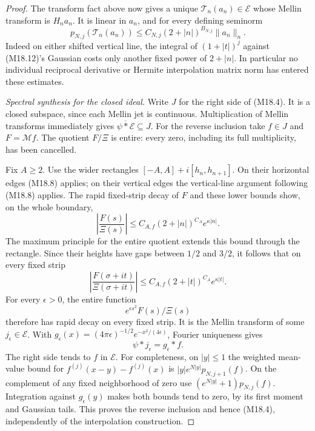 \begin{proof}
The transform fact above now gives a unique
\(\mathcal T_n(a_n)\in\mathcal E\) whose Mellin transform is
\(H_n a_n\).  It is linear in \(a_n\), and for every
defining seminorm
\[
 p_{N,j}(\mathcal T_n(a_n))
       \le C_{N,j}(2+|n|)^{B_{N,j}}\|a_n\|_n .                  \tag{M18.13}
\]
Indeed on either shifted vertical line, the integral
of \((1+|t|)^j\) against (M18.12)'s Gaussian costs
only another fixed power of \(2+|n|\).
In particular no individual reciprocal derivative
or Hermite interpolation matrix norm has entered
these estimates.

\emph{Spectral synthesis for the closed ideal.}
Write \(J\) for the right side of (M18.4).
It is a closed subspace, since each Mellin jet is
continuous.  Multiplication of Mellin transforms
immediately gives
\(\overline{\psi*\mathcal E}\subseteq J\).
For the reverse inclusion take \(f\in J\) and
\(F=\mathcal Mf\).  The quotient \(F/\Xi\) is entire:
every zero, including its full multiplicity, has
been cancelled.

Fix \(A\ge2\).  Use the wider rectangles
\([-A,A]+i[h_n,h_{n+1}]\).  On their horizontal
edges (M18.8) applies; on their vertical edges
the vertical-line argument following (M18.8)
applies.  The rapid fixed-strip decay of \(F\)
and these lower bounds show, on the whole boundary,
\[
 \left|\frac{F(s)}{\Xi(s)}\right|
       \le C_{A,f}(2+|n|)^{C_A}e^{\kappa|n|}.
\]
The maximum principle for the entire quotient
extends this bound through the rectangle.
Since their heights have gaps between \(1/2\)
and \(3/2\), it follows that on every fixed strip
\[
 \left|\frac{F(\sigma+it)}{\Xi(\sigma+it)}\right|
       \le C_{A,f}(2+|t|)^{C_A}e^{\kappa|t|}.                  \tag{M18.14}
\]
For every \(\epsilon>0\), the entire function
\[
                   e^{\epsilon s^2}F(s)/\Xi(s)
\]
therefore has rapid decay on every fixed strip.
It is the Mellin transform of some
\(j_\epsilon\in\mathcal E\).
With \(g_\epsilon(x)=(4\pi\epsilon)^{-1/2}
e^{-x^2/(4\epsilon)}\), Fourier uniqueness gives
\[
                         \psi*j_\epsilon=g_\epsilon*f.
\]
The right side tends to \(f\) in \(\mathcal E\).
For completeness, on \(|y|\le1\) the weighted
mean-value bound for
\(f^{(j)}(x-y)-f^{(j)}(x)\) is
\(|y|e^{N|y|}p_{N,j+1}(f)\).
On the complement of any fixed neighborhood of
zero use
\((e^{N|y|}+1)p_{N,j}(f)\).
Integration against \(g_\epsilon(y)\) makes both
bounds tend to zero, by its first moment and
Gaussian tails.  This proves the reverse inclusion
and hence (M18.4), independently of the interpolation
construction.


\end{proof}
